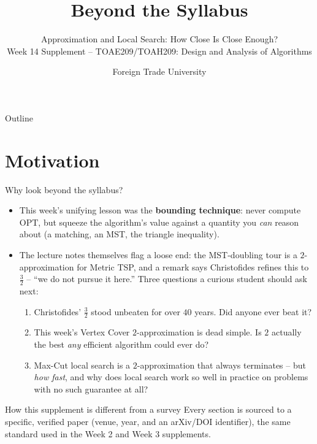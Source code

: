 \documentclass[11pt,aspectratio=169]{beamer}
\title{Beyond the Syllabus}
\subtitle{Approximation and Local Search: How Close Is Close Enough?\\
\small Week 14 Supplement -- TOAE209/TOAH209: Design and Analysis of Algorithms}
\author{Foreign Trade University}
\date{}
\begin{document}
\begin{frame}
  \titlepage
\end{frame}

\begin{frame}{Outline}
  \tableofcontents
\end{frame}

\section{Motivation}

\begin{frame}{Why look beyond the syllabus?}
  \begin{itemize}
    \item This week's unifying lesson was the \textbf{bounding technique}: never compute
    $\mathrm{OPT}$, but squeeze the algorithm's value against a quantity you \emph{can}
    reason about (a matching, an MST, the triangle inequality).
    \item The lecture notes themselves flag a loose end: the MST-doubling tour is a
    $2$-approximation for Metric TSP, and a remark says Christofides refines this to
    $\tfrac{3}{2}$ -- ``we do not pursue it here.'' Three questions a curious student
    should ask next:
    \begin{enumerate}
      \item Christofides' $\tfrac32$ stood unbeaten for over $40$ years. Did anyone ever
      beat it?
      \item This week's Vertex Cover $2$-approximation is dead simple. Is $2$ actually
      the best \emph{any} efficient algorithm could ever do?
      \item Max-Cut local search is a $2$-approximation that always terminates -- but
      \emph{how fast}, and why does local search work so well in practice on problems
      with no such guarantee at all?
    \end{enumerate}
  \end{itemize}
  \begin{alertblock}{How this supplement is different from a survey}
    Every section is sourced to a specific, verified paper (venue, year, and an
    arXiv/DOI identifier), the same standard used in the Week 2 and Week 3 supplements.
  \end{alertblock}
\end{frame}
\end{document}
